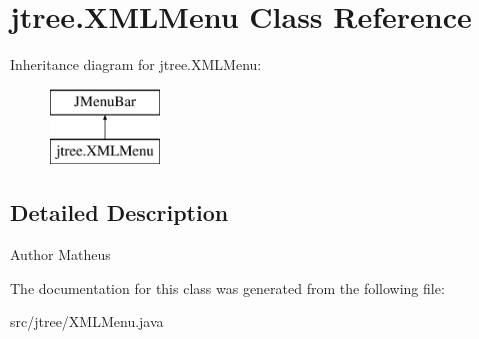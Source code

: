 \hypertarget{classjtree_1_1_x_m_l_menu}{\section{jtree.\+X\+M\+L\+Menu Class Reference}
\label{classjtree_1_1_x_m_l_menu}
}
Inheritance diagram for jtree.\+X\+M\+L\+Menu\+:\begin{figure}[H]
\begin{center}
\leavevmode
\includegraphics[height=2.000000cm]{classjtree_1_1_x_m_l_menu}
\end{center}
\end{figure}


\subsection{Detailed Description}
\begin{DoxyAuthor}{Author}
Matheus 
\end{DoxyAuthor}


The documentation for this class was generated from the following file\+:\begin{DoxyCompactItemize}
\item 
src/jtree/X\+M\+L\+Menu.\+java\end{DoxyCompactItemize}
